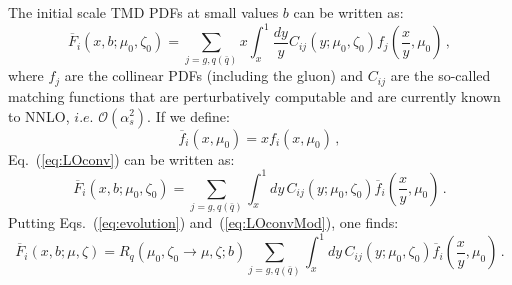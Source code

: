 \documentclass[10pt,a4paper]{article}
\begin{document}
The initial scale TMD PDFs at small values $b$ can be written as:
\begin{equation}\label{eq:LOconv}
\overline{F}_i(x,b;\mu_0,\zeta_0) = \sum_{j=g,q(\bar{q})}x\int_x^1\frac{dy}{y}C_{ij}(y;\mu_0,\zeta_0)f_j\left(\frac{x}{y},\mu_0\right)\,,
\end{equation}
where $f_j$ are the collinear PDFs (including the gluon) and $C_{ij}$
are the so-called matching functions that are perturbatively
computable and are currently known to NNLO, $i.e.$
$\mathcal{O}(\alpha_s^2)$. If we define:
\begin{equation}
\overline{f}_i\left(x,\mu_0\right) = xf_i\left(x,\mu_0\right)\,,
\end{equation}
Eq.~(\ref{eq:LOconv}) can be written as:
\begin{equation}\label{eq:LOconvMod}
\overline{F}_i(x,b;\mu_0,\zeta_0) =
\sum_{j=g,q(\bar{q})}\int_x^1dy\,C_{ij}(y;\mu_0,\zeta_0)  \overline{f}_i\left(\frac{x}{y},\mu_0\right)\,.
\end{equation}
Putting Eqs.~(\ref{eq:evolution}) and~(\ref{eq:LOconvMod}), one finds:
\begin{equation}\label{eq:pertTMD}
  \overline{F}_i(x,b;\mu,\zeta) = R_q(\mu_0,\zeta_0\rightarrow \mu,\zeta;b)
  \sum_{j=g,q(\bar{q})}\int_x^1dy\,C_{ij}(y;\mu_0,\zeta_0)  \overline{f}_i\left(\frac{x}{y},\mu_0\right)\,.
\end{equation}
\end{document}
